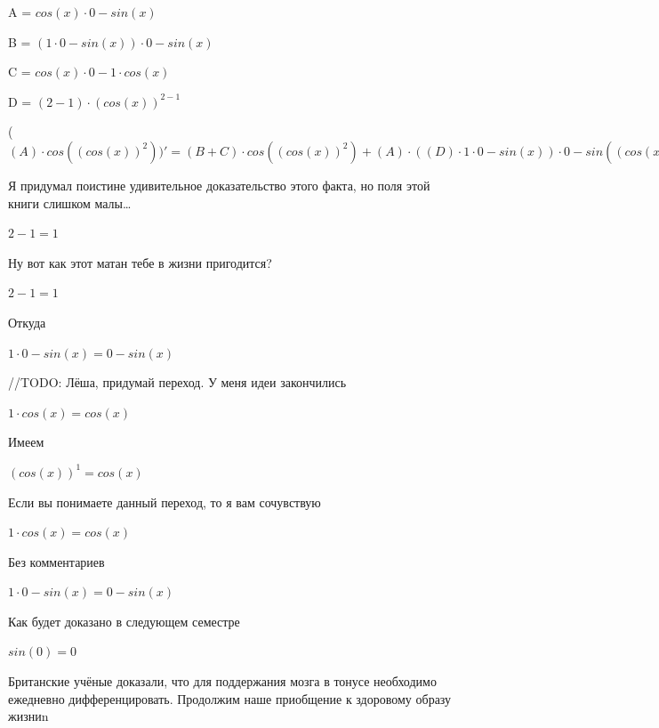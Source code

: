 \documentclass[12pt,a4paper,fleqn]{article}
\begin{document}
\begin{center}
A = $cos(x) \cdot 0-sin(x)$\end{center}
\begin{center}
B = $(1 \cdot 0-sin(x)) \cdot 0-sin(x)$\end{center}
\begin{center}
C = $cos(x) \cdot 0-1 \cdot cos(x)$\end{center}
\begin{center}
D = $(2-1) \cdot (cos(x))^{2-1}$\end{center}
\begin{center}
 ($(A) \cdot cos((cos(x))^{2}))'
  = (B+C) \cdot cos((cos(x))^{2})+(A) \cdot ((D) \cdot 1 \cdot 0-sin(x)) \cdot 0-sin((cos(x))^{2})$\end{center}
Я придумал поистине удивительное доказательство этого факта, но поля этой книги слишком малы\ldots

\begin{center}$2-1 = 1$\end{center}
Ну вот как этот матан тебе в жизни пригодится?

\begin{center}$2-1 = 1$\end{center}
Откуда

\begin{center}
$1 \cdot 0-sin(x) = 0-sin(x)$\end{center}
//TODO: Лёша, придумай переход. У меня идеи закончились

\begin{center}
$1 \cdot cos(x) = cos(x)$\end{center}
Имеем

\begin{center}
$(cos(x))^{1} = cos(x)$\end{center}
Если вы понимаете данный переход, то я вам сочувствую

\begin{center}
$1 \cdot cos(x) = cos(x)$\end{center}
Без комментариев\cite{link4}

\begin{center}
$1 \cdot 0-sin(x) = 0-sin(x)$\end{center}
Как будет доказано в следующем семестре

\begin{center}$sin(0) = 0$\end{center}
Британские учёные доказали, что для поддержания мозга в тонусе необходимо ежедневно дифференцировать. Продолжим наше приобщение к здоровому образу жизниn
\end{document}
